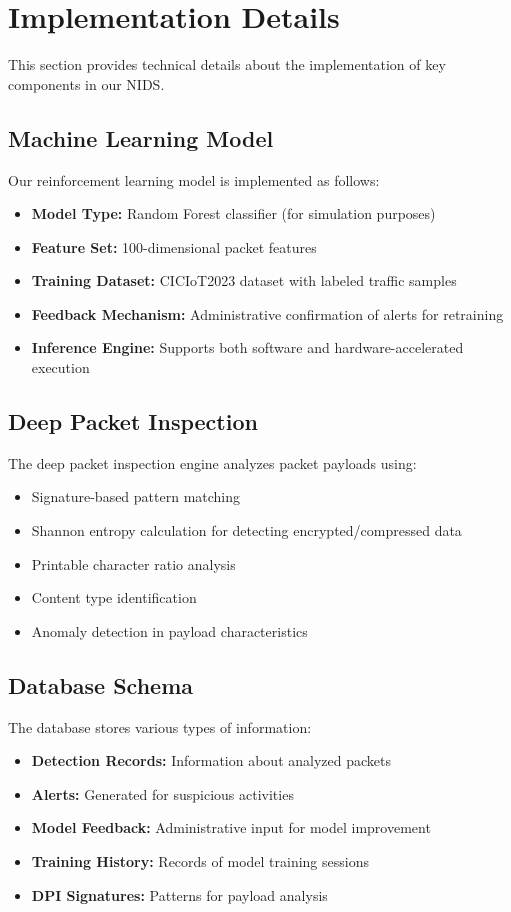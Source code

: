 \documentclass[12pt]{article}
\begin{document}
\section{Implementation Details}
This section provides technical details about the implementation of key components in our NIDS.

\subsection{Machine Learning Model}
Our reinforcement learning model is implemented as follows:
\begin{itemize}
  \item \textbf{Model Type:} Random Forest classifier (for simulation purposes)
  \item \textbf{Feature Set:} 100-dimensional packet features
  \item \textbf{Training Dataset:} CICIoT2023 dataset with labeled traffic samples
  \item \textbf{Feedback Mechanism:} Administrative confirmation of alerts for retraining
  \item \textbf{Inference Engine:} Supports both software and hardware-accelerated execution
\end{itemize}

\subsection{Deep Packet Inspection}
The deep packet inspection engine analyzes packet payloads using:
\begin{itemize}
  \item Signature-based pattern matching
  \item Shannon entropy calculation for detecting encrypted/compressed data
  \item Printable character ratio analysis
  \item Content type identification
  \item Anomaly detection in payload characteristics
\end{itemize}

\subsection{Database Schema}
The database stores various types of information:
\begin{itemize}
  \item \textbf{Detection Records:} Information about analyzed packets
  \item \textbf{Alerts:} Generated for suspicious activities
  \item \textbf{Model Feedback:} Administrative input for model improvement
  \item \textbf{Training History:} Records of model training sessions
  \item \textbf{DPI Signatures:} Patterns for payload analysis
\end{itemize}
\end{document}
